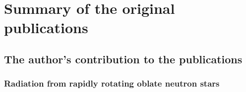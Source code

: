 \chapter{Summary of the original publications}





\section{The author's contribution to the publications} 

\subsection{Radiation from rapidly rotating oblate neutron stars}


